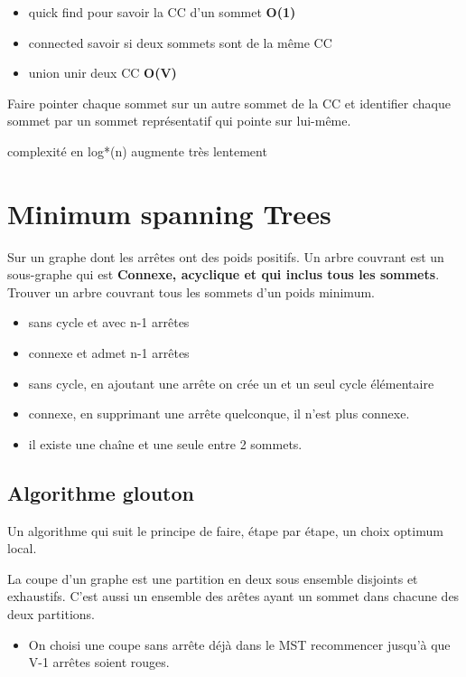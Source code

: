 \documentclass[
]{article}
\begin{document}
\begin{itemize}
\item
  quick find pour savoir la CC d'un sommet \textbf{O(1)}
\item
  connected savoir si deux sommets sont de la même CC
\item
  union unir deux CC \textbf{O(V)}
\end{itemize}

Faire pointer chaque sommet sur un autre sommet de la CC et identifier
chaque sommet par un sommet représentatif qui pointe sur lui-même.

complexité en log*(n) augmente très lentement

\hypertarget{header-n74}{%
\section{Minimum spanning Trees}\label{header-n74}}

Sur un graphe dont les arrêtes ont des poids positifs. Un arbre couvrant
est un sous-graphe qui est \textbf{Connexe, acyclique et qui inclus tous
les sommets}. Trouver un arbre couvrant tous les sommets d'un poids
minimum.

\begin{itemize}
\item
  sans cycle et avec n-1 arrêtes
\item
  connexe et admet n-1 arrêtes 
\item
  sans cycle, en ajoutant une arrête on crée un et un seul cycle
  élémentaire
\item
  connexe, en supprimant une arrête quelconque, il n'est plus connexe. 
\item
  il existe une chaîne et une seule entre 2 sommets. 
\end{itemize}

\hypertarget{header-n87}{%
\subsection{Algorithme glouton}\label{header-n87}}

Un algorithme qui suit le principe de faire, étape par étape, un choix
optimum local.

La coupe d'un graphe est une partition en deux sous ensemble disjoints
et exhaustifs. C'est aussi un ensemble des arêtes ayant un sommet dans
chacune des deux partitions.

\begin{itemize}
\item
  On choisi une coupe sans arrête déjà dans le MST recommencer jusqu'à
  que V-1 arrêtes soient rouges. 
\end{itemize}
\end{document}
